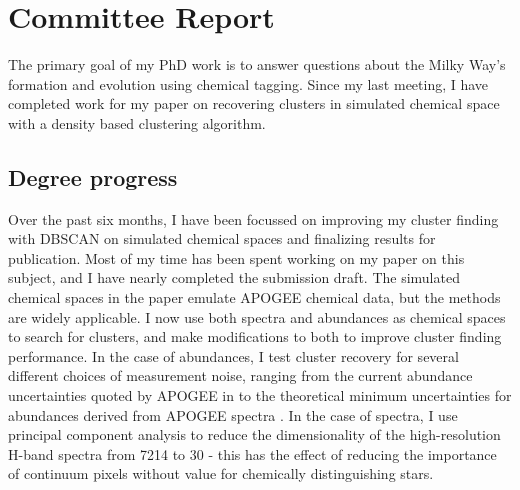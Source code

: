 \documentclass[11pt]{article}
\begin{document}
    
    \section*{Committee Report}
    
    The primary goal of my PhD work is to answer questions about the Milky Way's formation and evolution using chemical tagging. Since my last meeting, I have completed work for my paper on recovering clusters in simulated chemical space with a density based clustering algorithm.    

    \subsection*{Degree progress}

	Over the past six months, I have been focussed on improving my cluster finding with DBSCAN \citep{Ester1996} on simulated chemical spaces and finalizing results for publication. Most of my time has been spent working on my paper on this subject, and I have nearly completed the submission draft. The simulated chemical spaces in the paper emulate APOGEE \citep{Majewski2017} chemical data, but the methods are widely applicable. I now use both spectra and abundances as chemical spaces to search for clusters, and make modifications to both to improve cluster finding performance. In the case of abundances, I test cluster recovery for several different choices of measurement noise, ranging from the current abundance uncertainties quoted by APOGEE in \citealt{DR14} to the theoretical minimum uncertainties for abundances derived from APOGEE spectra \citep{Ting}. In the case of spectra, I use principal component analysis to reduce the dimensionality of the high-resolution H-band spectra from 7214 to 30 - this has the effect of reducing the importance of continuum pixels without value for chemically distinguishing stars.
	
\end{document}
